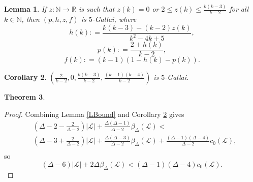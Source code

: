 \documentclass[12pt]{article}
\theoremstyle{plain}
\newtheorem{thm}{Theorem}
\newtheorem{lem}[thm]{Lemma}
\newtheorem{cor}[thm]{Corollary}
\theoremstyle{definition}
\theoremstyle{remark}
\newcommand{\fancy}[1]{\mathcal{#1}}
\newcommand{\IN}{\mathbb{N}}
\newcommand{\IR}{\mathbb{R}}
\renewcommand{\L}{\fancy{L}}
\newcommand{\card}[1]{\left|#1\right|}
\newcommand{\func}[3]{#1\colon #2 \rightarrow #3}
\newcommand{\parens}[1]{\left( #1 \right)}
\newcommand{\DefinedAs}{\mathrel{\mathop:}=}
\begin{document}
\begin{lem}
If $\func{z}{\IN}{\IR}$ is such that $z(k) = 0$ or $2 \le z(k) \le \frac{k(k-3)}{k-2}$  for all $k \in \IN$, then 
$(p,h,z,f)$ is $5$-Gallai, where
\[h(k) \DefinedAs \frac{k(k-3) - (k-2)z(k)}{k^2-4k+5},\]
\[p(k) \DefinedAs \frac{2 + h(k)}{k-2},\]
\[f(k) \DefinedAs (k-1)(1 - h(k) - p(k)).\]
\end{lem}

\begin{cor}\label{GBound}
$\parens{\frac{2}{k-2}, 0, \frac{k(k-3)}{k-2}, \frac{(k-1)(k-4)}{k-2}}$ is $5$-Gallai.
\end{cor}

\begin{thm}\label{LBoundT}

\end{thm}
\begin{proof}
Combining Lemma \ref{LBound} and Corollary \ref{GBound} gives
\begin{align*}
&\parens{\Delta-2 - \frac{2}{\Delta-2}}\card{\L} + \frac{\Delta(\Delta-1)}{\Delta-2}\beta_{\Delta}(\L) <\\
&\parens{\Delta - 3 + \frac{2}{\Delta-2}}\card{\L} + \frac{\Delta(\Delta-3)}{\Delta-2}\beta_{\Delta}(\L) + \frac{(\Delta-1)(\Delta-4)}{\Delta-2}c_0(\L),\\
\end{align*}
so
\[(\Delta-6)\card{\L} + 2\Delta\beta_{\Delta}(\L) < (\Delta-1)(\Delta-4)c_0(\L).\]
\end{proof}
\end{document}
